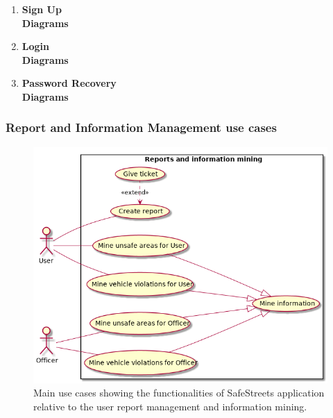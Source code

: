\newpage
\begin{enumerate}
	\item \textbf{Sign Up}\\
		
		\newpage
		\textbf{Diagrams}
		\newpage
	\item \textbf{Login}\\
		
		\newpage
		\textbf{Diagrams}
		\newpage
	\item \textbf{Password Recovery}\\
		
		\newpage
		\textbf{Diagrams}
		\newpage
\end{enumerate}
\newpage

\subsubsection{Report and Information Management use cases}
\begin{figure}[htp]
	\centering
	\includegraphics[width=\textwidth]{images/useCases/uc_report_and_information_mining.png}
	\caption{Main use cases showing the functionalities of SafeStreets application relative to the user report management and information mining.} 
	\label{fig:reportmanagement} 
\end{figure}

